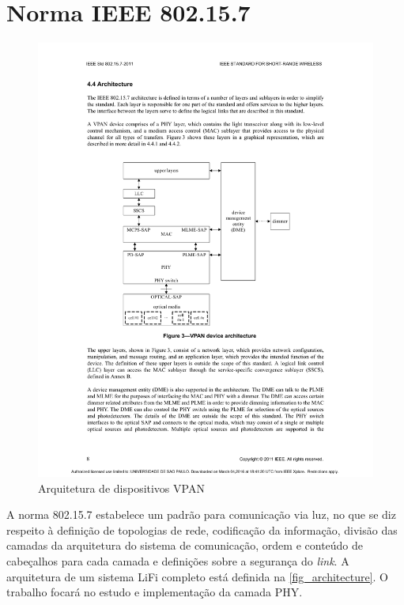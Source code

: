 	\section{Norma IEEE 802.15.7}\label{sec-norma}
	\begin{figure}[htb]
		\caption{\label{fig_architecture} Arquitetura de dispositivos VPAN}
		\centering
		\includegraphics[width=0.5\textheight,trim={5cm 9.6cm 5.3cm 7cm}, clip]{pag31.pdf}
	\end{figure}

	A norma 802.15.7 estabelece um padrão para comunicação via luz, no que se diz respeito à definição de topologias de rede, codificação da informação, divisão das camadas da arquitetura do sistema de comunicação, ordem e conteúdo de cabeçalhos para cada camada e definições sobre a segurança do \textit{link}. A arquitetura de um sistema LiFi completo está definida na \autoref{fig_architecture}. 
	O trabalho focará no estudo e implementação da camada PHY.
	
